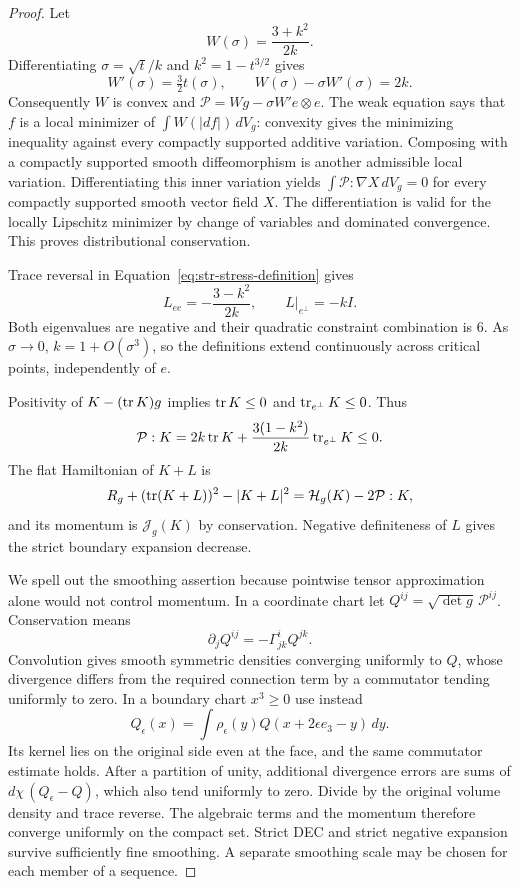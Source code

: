 \begin{proof}
Let
\[
 W(\sigma)=\frac{3+k^2}{2k}.
\]
Differentiating $\sigma=\sqrt t/k$ and $k^2=1-t^{3/2}$ gives
\begin{equation}
 W'(\sigma)=\tfrac32t(\sigma),\qquad
 W(\sigma)-\sigma W'(\sigma)=2k.
 \label{eq:str-domain-stress-calculation}
\end{equation}
Consequently $W$ is convex and
$\mathcal P=Wg-\sigma W'e\otimes e$. The weak equation says that
$f$ is a local minimizer of $\int W(|df|)\,dV_g$: convexity gives
the minimizing inequality against every compactly supported additive
variation. Composing with a compactly supported smooth diffeomorphism
is another admissible local variation. Differentiating this inner
variation yields
$\int\mathcal P:\nabla X\,dV_g=0$ for every compactly supported
smooth vector field $X$. The differentiation is valid for the locally
Lipschitz minimizer by change of variables and dominated convergence.
This proves distributional conservation.

Trace reversal in Equation~\eqref{eq:str-stress-definition} gives
\begin{equation}
 L_{ee}=-\frac{3-k^2}{2k},\qquad L|_{e^\perp}=-kI.
 \label{eq:str-L-eigenvalues}
\end{equation}
Both eigenvalues are negative and their quadratic constraint
combination is $6$. As $\sigma\to0$, $k=1+O(\sigma^3)$, so the
definitions extend continuously across critical points, independently
of $e$.

Positivity of $K-(\operatorname{tr} K)g$ implies
$\operatorname{tr} K\leq0$ and $\operatorname{tr}_{e^\perp}K\leq0$. Thus
\[
 \mathcal P:K=2k\operatorname{tr} K+
      \frac{3(1-k^2)}{2k}\operatorname{tr}_{e^\perp}K\leq0.
\]
The flat Hamiltonian of $K+L$ is
\[
 R_g+(\operatorname{tr}(K+L))^2-|K+L|^2
 =\mathcal H_g(K)-2\mathcal P:K,
\]
and its momentum is $\mathcal J_g(K)$ by conservation. Negative
definiteness of $L$ gives the strict boundary expansion decrease.

We spell out the smoothing assertion because pointwise tensor
approximation alone would not control momentum. In a coordinate
chart let $Q^{ij}=\sqrt{\det g}\,\mathcal P^{ij}$. Conservation means
\[
 \partial_jQ^{ij}=-\Gamma^i_{jk}Q^{jk}.
\]
Convolution gives smooth symmetric densities converging uniformly to
$Q$, whose divergence differs from the required connection term by a
commutator tending uniformly to zero. In a boundary chart $x^3\geq0$
use instead
\[
 Q_\epsilon(x)=\int\rho_\epsilon(y)
                         Q(x+2\epsilon e_3-y)\,dy.
\]
Its kernel lies on the original side even at the face, and the same
commutator estimate holds. After a partition of unity, additional
divergence errors are sums of $d\chi\,(Q_\epsilon-Q)$, which also
tend uniformly to zero. Divide by the original volume density and
trace reverse. The algebraic terms and the momentum therefore converge
uniformly on the compact set. Strict DEC and strict negative expansion
survive sufficiently fine smoothing. A separate smoothing scale may
be chosen for each member of a sequence.
\end{proof}

